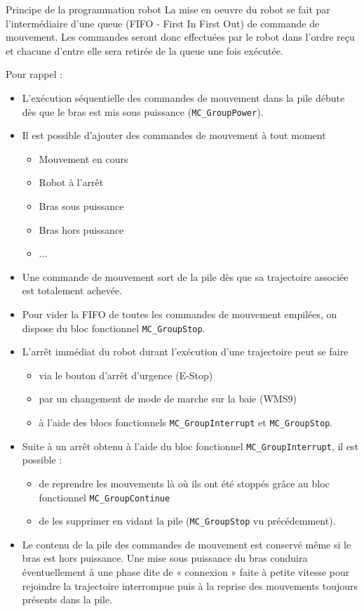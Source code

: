 
\begin{UPSTIinfor}{Principe de la programmation robot}
    La mise en oeuvre du robot se fait par l'intermédiaire d'une queue (FIFO - First In First Out) de commande de mouvement. Les commandes seront donc effectuées par le robot dans l'ordre reçu et chacune d'entre elle sera retirée de la queue une fois exécutée. 
    
    Pour rappel : 
    \begin{itemize}
        \item L'exécution séquentielle des commandes de mouvement dans la pile débute dès que le bras est mis sous puissance (\texttt{MC\_GroupPower}).
        \item Il est possible d'ajouter des commandes de mouvement à tout moment 
        \begin{itemize}
            \item Mouvement en cours
            \item Robot à l'arrêt 
            \item Bras sous puissance
            \item Bras hors puissance
            \item ...
        \end{itemize}
        \item Une commande de mouvement sort de la pile dès que sa trajectoire associée est totalement achevée.
        \item Pour vider la FIFO de toutes les commandes de mouvement empilées, on dispose du bloc fonctionnel \texttt{MC\_GroupStop}.
        \item L'arrêt immédiat du robot durant l'exécution d'une trajectoire peut se faire 
        \begin{itemize}
            \item via le bouton d'arrêt d'urgence (E-Stop)
            \item par un changement de mode de marche sur la baie (WMS9)
            \item à l'aide des blocs fonctionnels \texttt{MC\_GroupInterrupt} et \texttt{MC\_GroupStop}.
        \end{itemize}
        \item Suite à un arrêt obtenu à l'aide du bloc fonctionnel \texttt{MC\_GroupInterrupt}, il est possible : 
        \begin{itemize}
            \item de reprendre les mouvements là où ils ont été stoppés grâce au bloc fonctionnel \texttt{MC\_GroupContinue}
            \item de les supprimer en vidant la pile (\texttt{MC\_GroupStop} vu précédemment).
        \end{itemize} 
        \item Le contenu de la pile des commandes de mouvement est conservé même si le bras est hors puissance. Une mise sous puissance du bras conduira éventuellement à une phase dite de « connexion » faite à petite vitesse pour rejoindre la trajectoire interrompue puis à la reprise des mouvements toujours présents dans la pile.
    \end{itemize}
    
\end{UPSTIinfor}


